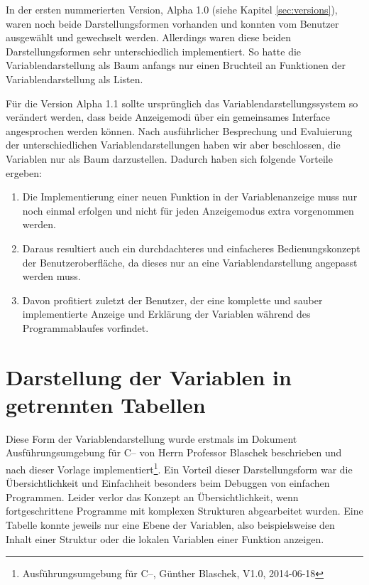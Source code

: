 In der ersten nummerierten Version, Alpha 1.0 (siehe Kapitel \ref{sec:versions}), waren noch beide Darstellungsformen vorhanden und konnten vom Benutzer ausgewählt und gewechselt werden. Allerdings waren diese beiden Darstellungsformen sehr unterschiedlich implementiert. So hatte die Variablendarstellung als Baum anfangs nur einen Bruchteil an Funktionen der Variablendarstellung als Listen.

Für die Version Alpha 1.1 sollte ursprünglich das Variablendarstellungssystem so verändert werden, dass beide Anzeigemodi über ein gemeinsames Interface angesprochen werden können. Nach ausführlicher Besprechung und Evaluierung der unterschiedlichen Variablendarstellungen haben wir aber beschlossen, die Variablen nur als Baum darzustellen. Dadurch haben sich folgende Vorteile ergeben:
\begin{enumerate}
\item Die Implementierung einer neuen Funktion in der Variablenanzeige muss nur noch einmal erfolgen und nicht für jeden Anzeigemodus extra vorgenommen werden.
\item Daraus resultiert auch ein durchdachteres und einfacheres Bedienungskonzept der Benutzeroberfläche, da dieses nur an eine Variablendarstellung angepasst werden muss.
\item Davon profitiert zuletzt der Benutzer, der eine komplette und sauber implementierte Anzeige und Erklärung der Variablen während des Programmablaufes vorfindet.
\end{enumerate}

\section{Darstellung der Variablen in getrennten Tabellen}

Diese Form der Variablendarstellung wurde erstmals im Dokument Ausführungsumgebung für C-- von Herrn Professor Blaschek beschrieben und nach dieser Vorlage implementiert\footnote{Ausführungsumgebung für C--, Günther Blaschek, V1.0, 2014-06-18}. Ein Vorteil dieser Darstellungsform war die Übersichtlichkeit und Einfachheit besonders beim Debuggen von einfachen Programmen. Leider verlor das Konzept an Übersichtlichkeit, wenn fortgeschrittene Programme mit komplexen Strukturen abgearbeitet wurden. Eine Tabelle konnte jeweils nur eine Ebene der Variablen, also beispielsweise den Inhalt einer Struktur oder die lokalen Variablen einer Funktion anzeigen.

